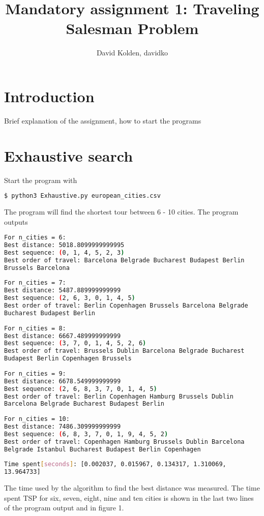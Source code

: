 \documentclass{article}
\author{David Kolden, davidko}
\title{Mandatory assignment 1: Traveling Salesman Problem}
\begin{document}
\maketitle
\tableofcontents

\section{Introduction}
Brief explanation of the assignment, how to start the programs
\section{Exhaustive search}

Start the program with
\begin{lstlisting}[language=bash]
	$ python3 Exhaustive.py european_cities.csv 
\end{lstlisting}
The program will find the shortest tour between 6 - 10 cities. The program outputs

\begin{lstlisting}[language=bash]
For n_cities = 6:
Best distance: 5018.8099999999995
Best sequence: (0, 1, 4, 5, 2, 3)
Best order of travel: Barcelona Belgrade Bucharest Budapest Berlin 
Brussels Barcelona
 
For n_cities = 7:
Best distance: 5487.889999999999
Best sequence: (2, 6, 3, 0, 1, 4, 5)
Best order of travel: Berlin Copenhagen Brussels Barcelona Belgrade 
Bucharest Budapest Berlin
 
For n_cities = 8:
Best distance: 6667.489999999999
Best sequence: (3, 7, 0, 1, 4, 5, 2, 6)
Best order of travel: Brussels Dublin Barcelona Belgrade Bucharest 
Budapest Berlin Copenhagen Brussels
 
For n_cities = 9:
Best distance: 6678.549999999999
Best sequence: (2, 6, 8, 3, 7, 0, 1, 4, 5)
Best order of travel: Berlin Copenhagen Hamburg Brussels Dublin 
Barcelona Belgrade Bucharest Budapest Berlin
 
For n_cities = 10:
Best distance: 7486.309999999999
Best sequence: (6, 8, 3, 7, 0, 1, 9, 4, 5, 2)
Best order of travel: Copenhagen Hamburg Brussels Dublin Barcelona 
Belgrade Istanbul Bucharest Budapest Berlin Copenhagen
	 
Time spent[seconds]: [0.002037, 0.015967, 0.134317, 1.310069, 
13.964733]
\end{lstlisting}

The time used by the algorithm to find the best distance was measured. The time spent TSP for six, seven, eight, nine and ten cities is shown in the last two lines of the program output and in figure 1.
\end{document}
